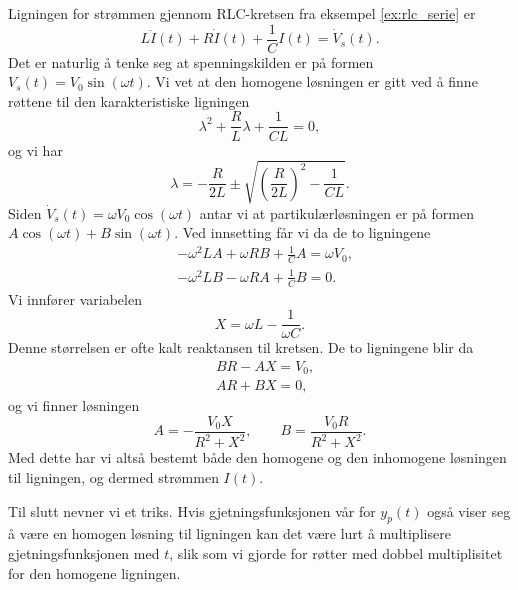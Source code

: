 \documentclass{article}
\theoremstyle{definition}
\theoremstyle{remark}
\newenvironment{ex}
{\pushQED{\qed}\renewcommand{\qedsymbol}{$\triangle$}\exx}
{\popQED\endexx}
\begin{document}
\begin{multicols*}{2}
\begin{ex}
  Ligningen for strømmen gjennom RLC-kretsen fra eksempel \ref{ex:rlc_serie} er
  \begin{equation*}
    L \ddot{I}(t) + R \dot{I}(t) + \frac{1}{C} I(t) = \dot{V}_s(t).
  \end{equation*}
  Det er naturlig å tenke seg at spenningskilden er på formen $V_s(t) = V_0 \sin(\omega t)$. Vi vet at den homogene løsningen er gitt ved å finne røttene til den karakteristiske ligningen
  \begin{equation*}
    \lambda^2 + \frac{R}{L} \lambda + \frac{1}{CL} = 0,
  \end{equation*}
  og vi har 
  \begin{equation*}
    \lambda = -\frac{R}{2L} \pm \sqrt{\left(\frac{R}{2L}\right)^2 - \frac{1}{CL}}.  
  \end{equation*}
  Siden $\dot{V}_s(t) = \omega V_0 \cos(\omega t)$ antar vi at partikulærløsningen er på formen $A \cos(\omega t) + B\sin(\omega t)$. Ved innsetting får vi da de to ligningene
  \begin{equation*}
    \begin{split}
      & - \omega^2 L A + \omega R B + \frac{1}{C} A = \omega V_0, \\
      & - \omega^2 L B - \omega R A + \frac{1}{C} B = 0.
    \end{split}
  \end{equation*}
  Vi innfører variabelen
  \begin{equation*}
    X = \omega L - \frac{1}{\omega C}.
  \end{equation*}
  Denne størrelsen er ofte kalt reaktansen til kretsen. De to ligningene blir da
  \begin{equation*}
    \begin{split}
      & BR - AX = V_0, \\
      & AR + BX = 0,
    \end{split}
  \end{equation*}
  og vi finner løsningen
  \begin{equation*}
    A = -\frac{V_0 X}{R^2 + X^2}, \qquad B = \frac{V_0 R}{R^2 + X^2}.
  \end{equation*}
  Med dette har vi altså bestemt både den homogene og den inhomogene løsningen til ligningen, og dermed strømmen $I(t)$.
\end{ex}

Til slutt nevner vi et triks. Hvis gjetningsfunksjonen vår for $y_p(t)$ også viser seg å være en homogen løsning til ligningen kan det være lurt å multiplisere gjetningsfunksjonen med $t$, slik som vi gjorde for røtter med dobbel multiplisitet for den homogene ligningen.


\end{multicols*}
\end{document}
